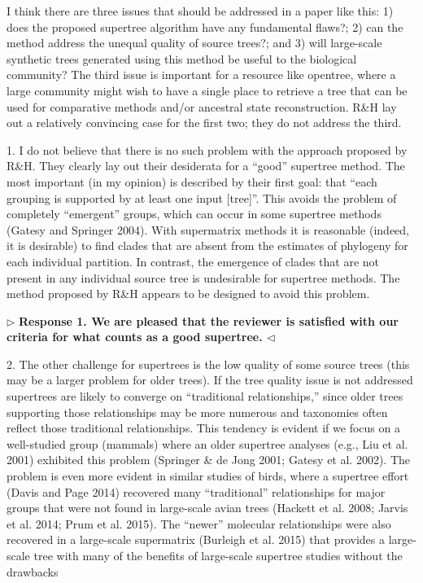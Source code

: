 \documentclass{article}
\newenvironment{reply}{$\triangleright$\bf}{$\triangleleft$}
\begin{document}
I think there are three issues that should be addressed in a paper like this: 1) does the proposed supertree algorithm have any fundamental flaws?; 2) can the method address the unequal quality of source trees?; and 3) will large-scale synthetic trees generated using this method be useful to the biological community? The third issue is important for a resource like opentree, where a large community might wish to have a single place to retrieve a tree that can be used for comparative methods and/or ancestral state reconstruction. R\&H lay out a relatively convincing case for the first two; they do not address the third.


1. I do not believe that there is no such problem with the approach proposed by R\&H. They clearly lay out their desiderata for a “good” supertree method. The most important (in my opinion) is described by their first goal: that “each grouping is supported by at least one input [tree]”. This avoids the problem of completely “emergent” groups, which can occur in some supertree methods (Gatesy and Springer 2004). With supermatrix methods it is reasonable (indeed, it is desirable) to find clades that are absent from the estimates of phylogeny for each individual partition. In contrast, the emergence of clades that are not present in any individual source tree is undesirable for supertree methods. The method proposed by R\&H appears to be designed to avoid this problem.

\begin{reply}
Response 1. We are pleased that the reviewer is satisfied with our criteria for what counts as a good supertree.
\end{reply}

2. The other challenge for supertrees is the low quality of some source trees (this may be a larger problem for older trees). If the tree quality issue is not addressed supertrees are likely to converge on “traditional relationships,” since older trees supporting those relationships may be more numerous and taxonomies often reflect those traditional relationships. This tendency is evident if we focus on a well-studied group (mammals) where an older supertree analyses (e.g., Liu et al. 2001) exhibited this problem (Springer \& de Jong 2001; Gatesy et al. 2002). The problem is even more evident in similar studies of birds, where a supertree effort (Davis and Page 2014) recovered many “traditional” relationships for major groups that were not found in large-scale avian trees (Hackett et al. 2008; Jarvis et al. 2014; Prum et al. 2015). The “newer” molecular relationships were also recovered in a large-scale supermatrix (Burleigh et al. 2015) that provides a large-scale tree with many of the benefits of large-scale supertree studies without the drawbacks
\end{document}

